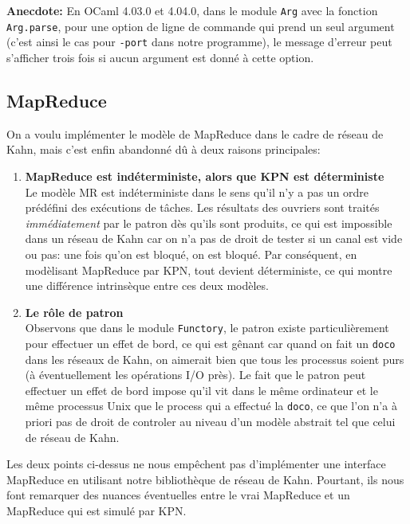 \textbf{Anecdote:} En OCaml 4.03.0 et 4.04.0, dans le module
\texttt{Arg} avec la fonction \texttt{Arg.parse}, pour une option de
ligne de commande qui prend un seul argument (c'est ainsi le cas pour
\texttt{-port} dans notre programme), le message d'erreur peut
s'afficher trois fois si aucun argument est donné à cette option.

\subsection{MapReduce}\label{mapreduce}

On a voulu implémenter le modèle de MapReduce dans le cadre de réseau de
Kahn, mais c'est enfin abandonné dû à deux raisons principales:

\begin{enumerate}
\def\labelenumi{\arabic{enumi}.}
\item
  \textbf{MapReduce est indéterministe, alors que KPN est déterministe}\\[0.5em]
  Le modèle MR est indéterministe dans le sens qu'il n'y
  a pas un ordre prédéfini des exécutions de tâches. Les résultats des
  ouvriers sont traités \emph{immédiatement} par le patron dès qu'ils
  sont produits, ce qui est impossible dans un réseau de Kahn car on n'a
  pas de droit de tester si un canal est vide ou pas: une fois qu'on est
  bloqué, on est bloqué. Par conséquent, en modèlisant MapReduce par
  KPN, tout devient déterministe, ce qui montre une différence
  intrinsèque entre ces deux modèles.
\item
  \textbf{Le rôle de patron}\\[0.5em]
  Observons que dans le module
  \texttt{Functory}, le patron existe particulièrement pour effectuer un
  effet de bord, ce qui est gênant car quand on fait un \texttt{doco}
  dans les réseaux de Kahn, on aimerait bien que tous les processus
  soient purs (à éventuellement les opérations I/O près). Le fait que le
  patron peut effectuer un effet de bord impose qu'il vit dans le même
  ordinateur et le même processus Unix que le process qui a effectué la
  \texttt{doco}, ce que l'on n'a à priori pas de droit de controler au
  niveau d'un modèle abstrait tel que celui de réseau de Kahn.
\end{enumerate}

Les deux points ci-dessus ne nous empêchent pas d'implémenter une
interface MapReduce en utilisant notre bibliothèque de réseau de Kahn.
Pourtant, ils nous font remarquer des nuances éventuelles entre le vrai
MapReduce et un MapReduce qui est simulé par KPN.

